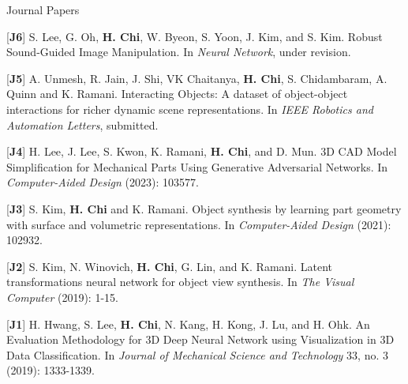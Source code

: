 


\begin{cventries}
\cvpub
{Journal Papers} %
{ %
\begin{cvitems}
    \item {[\textbf{J6}] S. Lee, G. Oh, \textbf{H. Chi}, W. Byeon, S. Yoon, J. Kim, and S. Kim. Robust Sound-Guided Image Manipulation. In \textit{Neural Network}, under revision.}
    \item {[\textbf{J5}] A. Unmesh,  R. Jain, J. Shi, VK Chaitanya, \textbf{H. Chi}, S. Chidambaram, A. Quinn and K. Ramani. Interacting Objects: A dataset of object-object interactions for richer dynamic scene representations. In \textit{IEEE Robotics and Automation Letters}, submitted.}
    \item {[\textbf{J4}] H. Lee, J. Lee, S. Kwon, K. Ramani, \textbf{H. Chi}, and D. Mun. 3D CAD Model Simplification for Mechanical Parts Using Generative Adversarial Networks. In \textit{Computer-Aided Design} (2023): 103577.}
    \item {[\textbf{J3}] S. Kim, \textbf{H. Chi} and K. Ramani. Object synthesis by learning part geometry with surface and volumetric representations. In \textit{Computer-Aided Design} (2021): 102932.}
    \item {[\textbf{J2}] S. Kim, N. Winovich, \textbf{H. Chi}, G. Lin, and K. Ramani. Latent transformations neural network for object view synthesis. In \textit{The Visual Computer} (2019): 1-15.}
    \item {[\textbf{J1}] H. Hwang, S. Lee, \textbf{H. Chi}, N. Kang, H. Kong, J. Lu, and H. Ohk. An Evaluation Methodology for 3D Deep Neural Network using Visualization in 3D Data Classification. In \textit{Journal of Mechanical Science and Technology} 33, no. 3 (2019): 1333-1339.}
\end{cvitems}
}


\end{cventries}
